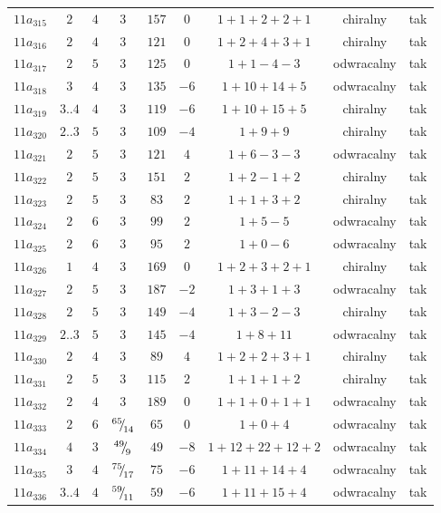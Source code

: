 \begin{longtable}{ccccccccc}
$11a_{315}$ & $2$ & $4$ & $3$ & $157$ & $0$ & $1+1+2+2+1$ & chiralny & tak \\
$11a_{316}$ & $2$ & $4$ & $3$ & $121$ & $0$ & $1+2+4+3+1$ & chiralny & tak \\
$11a_{317}$ & $2$ & $5$ & $3$ & $125$ & $0$ & $1+1-4-3$ & odwracalny & tak \\
$11a_{318}$ & $3$ & $4$ & $3$ & $135$ & $-6$ & $1+10+14+5$ & odwracalny & tak \\
$11a_{319}$ & $3..4$ & $4$ & $3$ & $119$ & $-6$ & $1+10+15+5$ & chiralny & tak \\
$11a_{320}$ & $2..3$ & $5$ & $3$ & $109$ & $-4$ & $1+9+9$ & chiralny & tak \\
$11a_{321}$ & $2$ & $5$ & $3$ & $121$ & $4$ & $1+6-3-3$ & odwracalny & tak \\
$11a_{322}$ & $2$ & $5$ & $3$ & $151$ & $2$ & $1+2-1+2$ & chiralny & tak \\
$11a_{323}$ & $2$ & $5$ & $3$ & $83$ & $2$ & $1+1+3+2$ & chiralny & tak \\
$11a_{324}$ & $2$ & $6$ & $3$ & $99$ & $2$ & $1+5-5$ & odwracalny & tak \\
$11a_{325}$ & $2$ & $6$ & $3$ & $95$ & $2$ & $1+0-6$ & odwracalny & tak \\
$11a_{326}$ & $1$ & $4$ & $3$ & $169$ & $0$ & $1+2+3+2+1$ & chiralny & tak \\
$11a_{327}$ & $2$ & $5$ & $3$ & $187$ & $-2$ & $1+3+1+3$ & odwracalny & tak \\
$11a_{328}$ & $2$ & $5$ & $3$ & $149$ & $-4$ & $1+3-2-3$ & chiralny & tak \\
$11a_{329}$ & $2..3$ & $5$ & $3$ & $145$ & $-4$ & $1+8+11$ & odwracalny & tak \\
$11a_{330}$ & $2$ & $4$ & $3$ & $89$ & $4$ & $1+2+2+3+1$ & chiralny & tak \\
$11a_{331}$ & $2$ & $5$ & $3$ & $115$ & $2$ & $1+1+1+2$ & chiralny & tak \\
$11a_{332}$ & $2$ & $4$ & $3$ & $189$ & $0$ & $1+1+0+1+1$ & odwracalny & tak \\
$11a_{333}$ & $2$ & $6$ & ${}^{65}{\mskip -5mu/\mskip -3mu}_{14}$ & $65$ & $0$ & $1+0+4$ & odwracalny & tak \\
$11a_{334}$ & $4$ & $3$ & ${}^{49}{\mskip -5mu/\mskip -3mu}_{9}$ & $49$ & $-8$ & $1+12+22+12+2$ & odwracalny & tak \\
$11a_{335}$ & $3$ & $4$ & ${}^{75}{\mskip -5mu/\mskip -3mu}_{17}$ & $75$ & $-6$ & $1+11+14+4$ & odwracalny & tak \\
$11a_{336}$ & $3..4$ & $4$ & ${}^{59}{\mskip -5mu/\mskip -3mu}_{11}$ & $59$ & $-6$ & $1+11+15+4$ & odwracalny & tak \\

\end{longtable}
